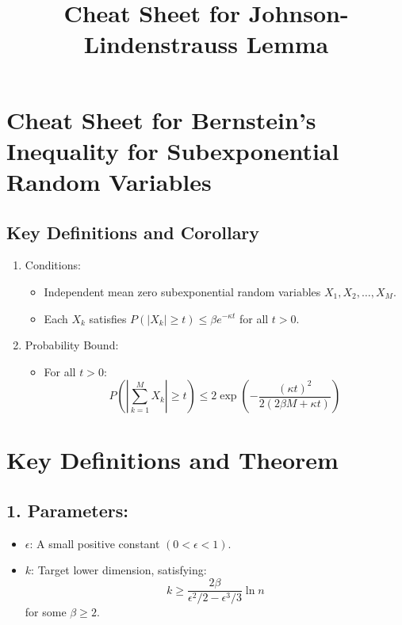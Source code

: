 \documentclass{article}
\begin{document}
\section*{Cheat Sheet for Bernstein's Inequality for Subexponential Random Variables}

\subsection*{Key Definitions and Corollary}

\begin{enumerate}[label=\arabic*.]
    \item Conditions:
    \begin{itemize}
        \item Independent mean zero subexponential random variables $X_1, X_2, \ldots, X_M$.
        \item Each $X_k$ satisfies $P\left( |X_k| \geq t \right) \leq \beta e^{-\kappa t}$ for all $t > 0$.
    \end{itemize}
    
    \item Probability Bound:
    \begin{itemize}
        \item For all $t > 0$:
        \[
        P\left( \left| \sum_{k=1}^{M} X_k \right| \geq t \right) \leq 2 \exp\left( -\frac{(\kappa t)^2}{2(2\beta M + \kappa t)} \right)
        \]
    \end{itemize}
\end{enumerate}









\title{Cheat Sheet for Johnson-Lindenstrauss Lemma}
\author{}
\date{}



\maketitle

\section*{Key Definitions and Theorem}

\subsection*{1. Parameters:}
\begin{itemize}
    \item $\epsilon$: A small positive constant $(0 < \epsilon < 1)$.
    \item $k$: Target lower dimension, satisfying:
    \[
    k \geq \frac{2\beta}{\epsilon^2/2 - \epsilon^3/3} \ln n
    \]
    for some $\beta \geq 2$.
\end{itemize}
\end{document}
